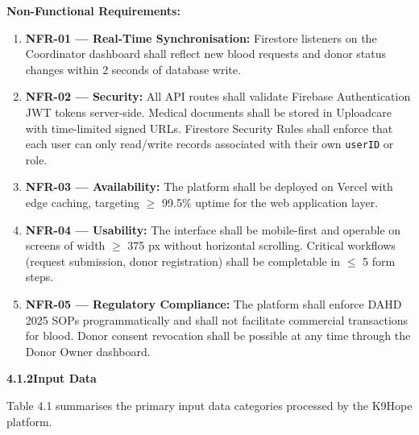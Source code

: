 \documentclass[12pt,a4paper]{article}
\begin{document}
\textbf{Non-Functional Requirements:}

\begin{enumerate}[leftmargin=1.8em, itemsep=0.4em]
    \item \textbf{NFR-01 — Real-Time Synchronisation:} Firestore listeners on the Coordinator dashboard shall reflect new blood requests and donor status changes within 2 seconds of database write.
    \item \textbf{NFR-02 — Security:} All API routes shall validate Firebase Authentication JWT tokens server-side. Medical documents shall be stored in Uploadcare with time-limited signed URLs. Firestore Security Rules shall enforce that each user can only read/write records associated with their own \texttt{userID} or role.
    \item \textbf{NFR-03 — Availability:} The platform shall be deployed on Vercel with edge caching, targeting $\geq$ 99.5\% uptime for the web application layer.
    \item \textbf{NFR-04 — Usability:} The interface shall be mobile-first and operable on screens of width $\geq$ 375 px without horizontal scrolling. Critical workflows (request submission, donor registration) shall be completable in $\leq$ 5 form steps.
    \item \textbf{NFR-05 — Regulatory Compliance:} The platform shall enforce DAHD 2025 SOPs programmatically and shall not facilitate commercial transactions for blood. Donor consent revocation shall be possible at any time through the Donor Owner dashboard.
\end{enumerate}

\vspace{1.5em}
\noindent\textbf{4.1.2\quad Input Data}
\vspace{0.6em}

\noindent Table 4.1 summarises the primary input data categories processed by the K9Hope platform.
\end{document}
